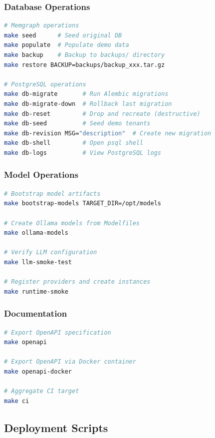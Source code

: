 \subsubsection{Database Operations}

\begin{lstlisting}[language=bash, caption=Database operation targets]
# Memgraph operations
make seed      # Seed original DB
make populate  # Populate demo data
make backup    # Backup to backups/ directory
make restore BACKUP=backups/backup_xxx.tar.gz

# PostgreSQL operations
make db-migrate       # Run Alembic migrations
make db-migrate-down  # Rollback last migration
make db-reset         # Drop and recreate (destructive)
make db-seed          # Seed demo tenants
make db-revision MSG="description"  # Create new migration
make db-shell         # Open psql shell
make db-logs          # View PostgreSQL logs
\end{lstlisting}

\subsubsection{Model Operations}

\begin{lstlisting}[language=bash, caption=Model operation targets]
# Bootstrap model artifacts
make bootstrap-models TARGET_DIR=/opt/models

# Create Ollama models from Modelfiles
make ollama-models

# Verify LLM configuration
make llm-smoke-test

# Register providers and create instances
make runtime-smoke
\end{lstlisting}

\subsubsection{Documentation}

\begin{lstlisting}[language=bash, caption=Documentation targets]
# Export OpenAPI specification
make openapi

# Export OpenAPI via Docker container
make openapi-docker

# Aggregate CI target
make ci
\end{lstlisting}

\subsection{Deployment Scripts}

